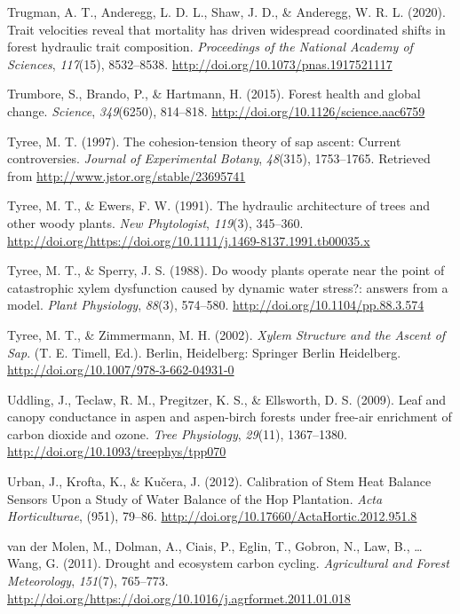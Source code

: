 \documentclass[11pt,twoside]{reedthesis}
\begin{document}
\hypertarget{ref-trugman_trait_2020}{}
Trugman, A. T., Anderegg, L. D. L., Shaw, J. D., \& Anderegg, W. R. L.
(2020). Trait velocities reveal that mortality has driven widespread
coordinated shifts in forest hydraulic trait composition.
\emph{Proceedings of the National Academy of Sciences}, \emph{117}(15),
8532--8538. \url{http://doi.org/10.1073/pnas.1917521117}

\hypertarget{ref-trumbore_forest_2015}{}
Trumbore, S., Brando, P., \& Hartmann, H. (2015). Forest health and
global change. \emph{Science}, \emph{349}(6250), 814--818.
\url{http://doi.org/10.1126/science.aac6759}

\hypertarget{ref-Tyree1997}{}
Tyree, M. T. (1997). The cohesion-tension theory of sap ascent: Current
controversies. \emph{Journal of Experimental Botany}, \emph{48}(315),
1753--1765. Retrieved from \url{http://www.jstor.org/stable/23695741}

\hypertarget{ref-TyreeEwers1991}{}
Tyree, M. T., \& Ewers, F. W. (1991). The hydraulic architecture of
trees and other woody plants. \emph{New Phytologist}, \emph{119}(3),
345--360.
\url{http://doi.org/https://doi.org/10.1111/j.1469-8137.1991.tb00035.x}

\hypertarget{ref-tyree_woody_1988}{}
Tyree, M. T., \& Sperry, J. S. (1988). Do woody plants operate near the
point of catastrophic xylem dysfunction caused by dynamic water stress?:
answers from a model. \emph{Plant Physiology}, \emph{88}(3), 574--580.
\url{http://doi.org/10.1104/pp.88.3.574}

\hypertarget{ref-tyree_xylem_2002}{}
Tyree, M. T., \& Zimmermann, M. H. (2002). \emph{Xylem Structure and the
Ascent of Sap}. (T. E. Timell, Ed.). Berlin, Heidelberg: Springer Berlin
Heidelberg. \url{http://doi.org/10.1007/978-3-662-04931-0}

\hypertarget{ref-Uddling2009}{}
Uddling, J., Teclaw, R. M., Pregitzer, K. S., \& Ellsworth, D. S.
(2009). Leaf and canopy conductance in aspen and aspen-birch forests
under free-air enrichment of carbon dioxide and ozone. \emph{Tree
Physiology}, \emph{29}(11), 1367--1380.
\url{http://doi.org/10.1093/treephys/tpp070}

\hypertarget{ref-Urban2012}{}
Urban, J., Krofta, K., \& Kučera, J. (2012). Calibration of Stem Heat
Balance Sensors Upon a Study of Water Balance of the Hop Plantation.
\emph{Acta Horticulturae}, (951), 79--86.
\url{http://doi.org/10.17660/ActaHortic.2012.951.8}

\hypertarget{ref-Vandermolen2011}{}
van der Molen, M., Dolman, A., Ciais, P., Eglin, T., Gobron, N., Law,
B., \ldots{} Wang, G. (2011). Drought and ecosystem carbon cycling.
\emph{Agricultural and Forest Meteorology}, \emph{151}(7), 765--773.
\url{http://doi.org/https://doi.org/10.1016/j.agrformet.2011.01.018}
\end{document}
